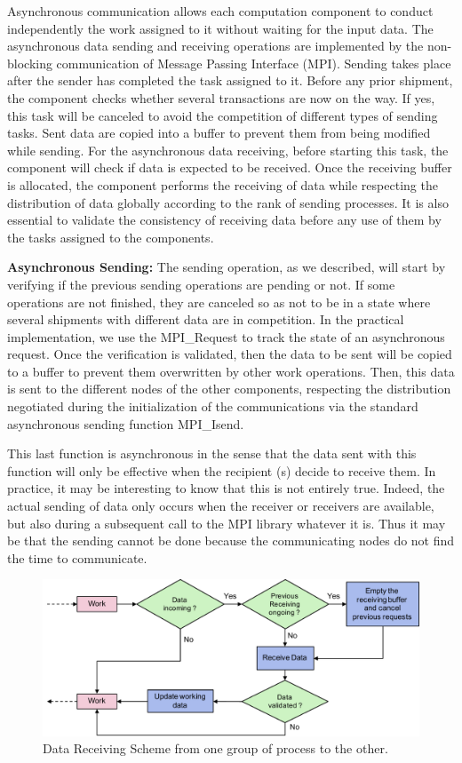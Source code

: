 Asynchronous communication allows each computation component to conduct independently the work assigned to it without waiting for the input data. The asynchronous data sending and receiving operations are implemented by the non-blocking communication of Message Passing Interface (MPI). Sending takes place after the sender has completed the task assigned to it. Before any prior shipment, the component checks whether several transactions are now on the way. If yes, this task will be canceled to avoid the competition of different types of sending tasks. Sent data are copied into a buffer to prevent them from being modified while sending. For the asynchronous data receiving, before starting this task, the component will check if data is expected to be received. Once the receiving buffer is allocated, the component performs the receiving of data while respecting the distribution of data globally according to the rank of sending processes. It is also essential to validate the consistency of receiving data before any use of them by the tasks assigned to the components.


\textbf{Asynchronous Sending:} The sending operation, as we described, will start by verifying if the previous sending operations are pending or not. If some operations are not finished, they are canceled so as not to be in a state where several shipments with different data are in competition. In the practical implementation, we use the MPI\_Request to track the state of an asynchronous request. Once the verification is validated, then the data to be sent will be copied to a buffer to prevent them overwritten by other work operations. Then, this data is sent to the different nodes of the other components, respecting the distribution negotiated during the initialization of the communications via the standard asynchronous sending function MPI\_Isend.

This last function is asynchronous in the sense that the data sent with this function will only be effective when the recipient (s) decide to receive them. In practice, it may be interesting to know that this is not entirely true. Indeed, the actual sending of data only occurs when the receiver or receivers are available, but also during a subsequent call to the MPI library whatever it is. Thus it may be that the sending cannot be done because the communicating nodes do not find the time to communicate. 

\begin{figure}
	\centering
	\includegraphics[width=6.2in]{fig/recv.pdf}
	\caption{Data Receiving Scheme from one group of process to the other.}
	\label{fig:recv}
\end{figure}

